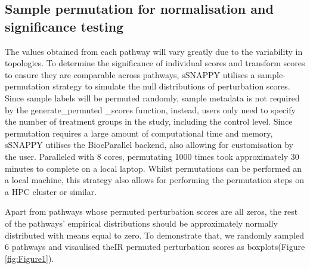 \documentclass[9pt,a4paper,]{extarticle}
\newenvironment{Shaded}{\begin{snugshade}}{\end{snugshade}}
\newcommand{\AttributeTok}[1]{\textcolor[rgb]{0.77,0.63,0.00}{#1}}
\newcommand{\DecValTok}[1]{\textcolor[rgb]{0.00,0.00,0.81}{#1}}
\newcommand{\FunctionTok}[1]{\textcolor[rgb]{0.00,0.00,0.00}{#1}}
\newcommand{\NormalTok}[1]{#1}
\newcommand{\OtherTok}[1]{\textcolor[rgb]{0.56,0.35,0.01}{#1}}
\newcommand{\SpecialCharTok}[1]{\textcolor[rgb]{0.00,0.00,0.00}{#1}}
\begin{document}
\hypertarget{sample-permutation-for-normalisation-and-significance-testing}{%
\subsection{Sample permutation for normalisation and significance testing}\label{sample-permutation-for-normalisation-and-significance-testing}}

The values obtained from each pathway will vary greatly due to the variability in topologies.
To determine the significance of individual scores and transform scores to ensure they are comparable across pathways, sSNAPPY utilises a sample-permutation strategy to simulate the null distributions of perturbation scores.
Since sample labels will be permuted randomly, sample metadata is not required by the generate\_permuted \_scores function, instead, users only need to specify the number of treatment groups in the study, including the control level.
Since permutation requires a large amount of computational time and memory, sSNAPPY utilises the BiocParallel backend\citep{BiocParallel}, also allowing for customisation by the user.
Paralleled with 8 cores, permutating 1000 times took approximately 30 minutes to complete on a local laptop.
Whilst permutations can be performed an a local machine, this strategy also allows for performing the permutation steps on a HPC cluster or similar.

\begin{Shaded}
\end{Shaded}

Apart from pathways whose permuted perturbation scores are all zeros, the rest of the pathways' empirical distributions should be approximately normally distributed with means equal to zero.
To demonstrate that, we randomly sampled 6 pathways and visaulised theIR permuted perturbation scores as boxplots(Figure \ref{fig:Figure1}).
\end{document}
